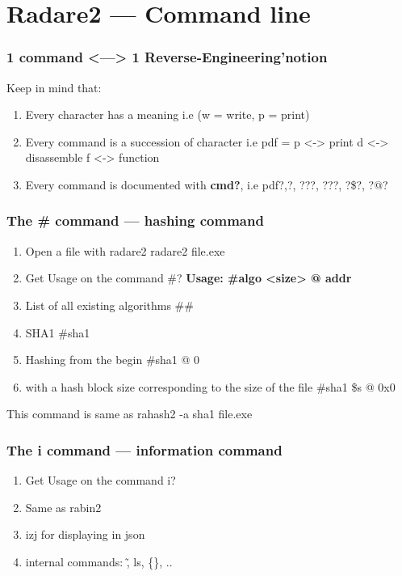 \documentclass[10pt, compress]{beamer}
\begin{document}
\section{Radare2 — Command line}

\begin{frame}[fragile]
  \frametitle{1 command <—> 1 Reverse-Engineering'notion}
  Keep in mind that:
  \begin{enumerate}
  \item Every character has a meaning i.e \alert{(w = write, p = print)}
  \item Every command is a succession of character i.e \alert{pdf = p <-> print d <-> disassemble f <-> function }
  \item Every command is documented with \textbf{cmd?}, i.e \alert{pdf?},\alert{?}, \alert{???}, \alert{???}, \alert{?\$?}, \alert{?@?}
  \end{enumerate}
\end{frame}

\begin{frame}[fragile]
  \frametitle{The \# command — hashing command}
  \begin{enumerate}
  \item Open a file with radare2 \alert{radare2 file.exe}
  \item Get Usage on the command \alert{\#?} \textbf{Usage: \#algo <size> @ addr}
  \item List of all existing algorithms \alert{\#\#}
  \item SHA1 \alert{\#sha1}
  \item Hashing from the begin \alert{\#sha1 @ 0}
  \item with a hash block size corresponding to the size of the file \alert{\#sha1 \$s @ 0x0}
 \end{enumerate}
This command is same as rahash2 -a sha1 file.exe
\end{frame}

\begin{frame}[fragile]
  \frametitle{The i command — information command}
  \begin{enumerate}
  \item Get Usage on the command \alert{i?}
  \item Same as \alert{rabin2}
  \item izj for displaying in json
  \item internal commands: \~, ls, \{\}, ..
 \end{enumerate}
\end{frame}
\end{document}
